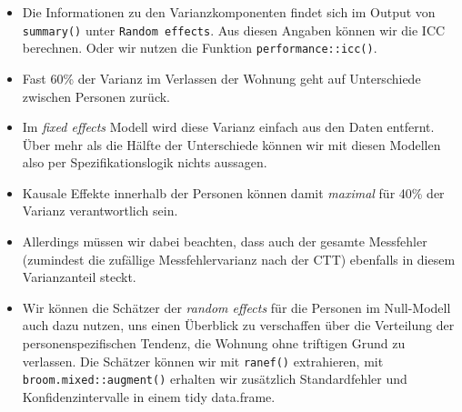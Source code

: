 \documentclass[
]{book}
\newenvironment{Shaded}{\begin{snugshade}}{\end{snugshade}}
\newcommand{\CommentTok}[1]{\textcolor[rgb]{0.56,0.35,0.01}{\textit{#1}}}
\newcommand{\DataTypeTok}[1]{\textcolor[rgb]{0.13,0.29,0.53}{#1}}
\newcommand{\DecValTok}[1]{\textcolor[rgb]{0.00,0.00,0.81}{#1}}
\newcommand{\FloatTok}[1]{\textcolor[rgb]{0.00,0.00,0.81}{#1}}
\newcommand{\KeywordTok}[1]{\textcolor[rgb]{0.13,0.29,0.53}{\textbf{#1}}}
\newcommand{\NormalTok}[1]{#1}
\newcommand{\OperatorTok}[1]{\textcolor[rgb]{0.81,0.36,0.00}{\textbf{#1}}}
\newcommand{\StringTok}[1]{\textcolor[rgb]{0.31,0.60,0.02}{#1}}
\begin{document}
\begin{itemize}
\item
  Die Informationen zu den Varianzkomponenten findet sich im Output von \texttt{summary()} unter \texttt{Random\ effects}. Aus diesen Angaben können wir die ICC berechnen. Oder wir nutzen die Funktion \texttt{performance::icc()}.
\item
  Fast 60\% der Varianz im Verlassen der Wohnung geht auf Unterschiede zwischen Personen zurück.
\item
  Im \emph{fixed effects} Modell wird diese Varianz einfach aus den Daten entfernt. Über mehr als die Hälfte der Unterschiede können wir mit diesen Modellen also per Spezifikationslogik nichts aussagen.
\item
  Kausale Effekte innerhalb der Personen können damit \emph{maximal} für 40\% der Varianz verantwortlich sein.
\item
  Allerdings müssen wir dabei beachten, dass auch der gesamte Messfehler (zumindest die zufällige Messfehlervarianz nach der CTT) ebenfalls in diesem Varianzanteil steckt.
\item
  Wir können die Schätzer der \emph{random effects} für die Personen im Null-Modell auch dazu nutzen, uns einen Überblick zu verschaffen über die Verteilung der personenspezifischen Tendenz, die Wohnung ohne triftigen Grund zu verlassen. Die Schätzer können wir mit \texttt{ranef()} extrahieren, mit \texttt{broom.mixed::augment()} erhalten wir zusätzlich Standardfehler und Konfidenzintervalle in einem tidy data.frame.
\end{itemize}

\begin{Shaded}
\end{Shaded}
\end{document}
